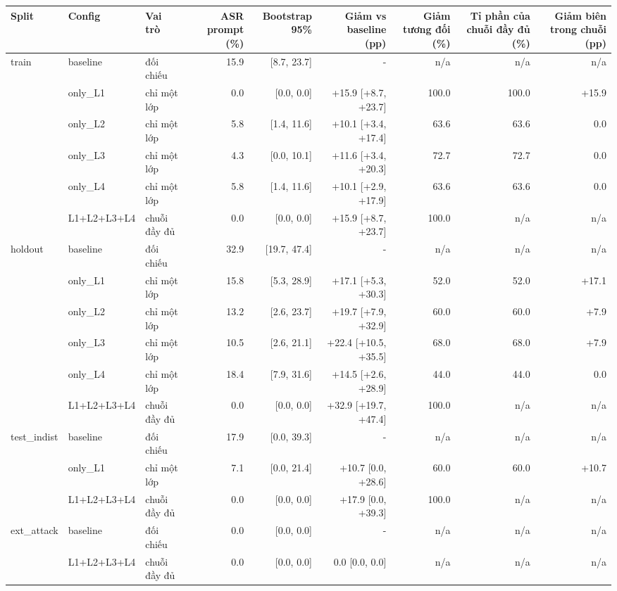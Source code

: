 \begin{tabular}{lllrrrrrr}
\toprule
Split & Config & Vai trò & ASR prompt (\%) & Bootstrap 95\% & Giảm vs baseline (pp) & Giảm tương đối (\%) & Tỉ phần của chuỗi đầy đủ (\%) & Giảm biên trong chuỗi (pp) \\
\midrule
train & baseline & đối chiếu & 15.9 & [8.7, 23.7] & - & n/a & n/a & n/a \\
 & only\_L1 & chỉ một lớp & 0.0 & [0.0, 0.0] & +15.9 [+8.7, +23.7] & 100.0 & 100.0 & +15.9 \\
 & only\_L2 & chỉ một lớp & 5.8 & [1.4, 11.6] & +10.1 [+3.4, +17.4] & 63.6 & 63.6 & 0.0 \\
 & only\_L3 & chỉ một lớp & 4.3 & [0.0, 10.1] & +11.6 [+3.4, +20.3] & 72.7 & 72.7 & 0.0 \\
 & only\_L4 & chỉ một lớp & 5.8 & [1.4, 11.6] & +10.1 [+2.9, +17.9] & 63.6 & 63.6 & 0.0 \\
 & L1+L2+L3+L4 & chuỗi đầy đủ & 0.0 & [0.0, 0.0] & +15.9 [+8.7, +23.7] & 100.0 & n/a & n/a \\
\midrule
holdout & baseline & đối chiếu & 32.9 & [19.7, 47.4] & - & n/a & n/a & n/a \\
 & only\_L1 & chỉ một lớp & 15.8 & [5.3, 28.9] & +17.1 [+5.3, +30.3] & 52.0 & 52.0 & +17.1 \\
 & only\_L2 & chỉ một lớp & 13.2 & [2.6, 23.7] & +19.7 [+7.9, +32.9] & 60.0 & 60.0 & +7.9 \\
 & only\_L3 & chỉ một lớp & 10.5 & [2.6, 21.1] & +22.4 [+10.5, +35.5] & 68.0 & 68.0 & +7.9 \\
 & only\_L4 & chỉ một lớp & 18.4 & [7.9, 31.6] & +14.5 [+2.6, +28.9] & 44.0 & 44.0 & 0.0 \\
 & L1+L2+L3+L4 & chuỗi đầy đủ & 0.0 & [0.0, 0.0] & +32.9 [+19.7, +47.4] & 100.0 & n/a & n/a \\
\midrule
test\_indist & baseline & đối chiếu & 17.9 & [0.0, 39.3] & - & n/a & n/a & n/a \\
 & only\_L1 & chỉ một lớp & 7.1 & [0.0, 21.4] & +10.7 [0.0, +28.6] & 60.0 & 60.0 & +10.7 \\
 & L1+L2+L3+L4 & chuỗi đầy đủ & 0.0 & [0.0, 0.0] & +17.9 [0.0, +39.3] & 100.0 & n/a & n/a \\
\midrule
ext\_attack & baseline & đối chiếu & 0.0 & [0.0, 0.0] & - & n/a & n/a & n/a \\
 & L1+L2+L3+L4 & chuỗi đầy đủ & 0.0 & [0.0, 0.0] & 0.0 [0.0, 0.0] & n/a & n/a & n/a \\
\bottomrule
\end{tabular}
